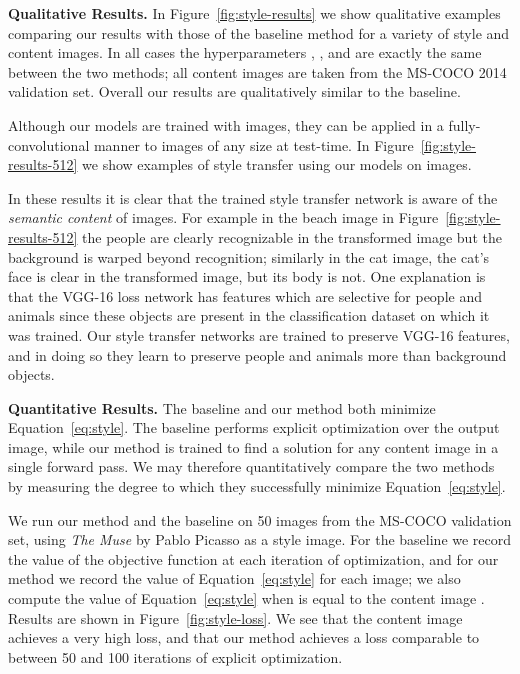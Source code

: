 \documentclass[runningheads]{llncs}
\begin{document}
\vspace{1mm}
\noindent \textbf{Qualitative Results.}
In Figure~\ref{fig:style-results} we show qualitative examples comparing our results with those
of the baseline method for a variety of style and content images. In all cases the hyperparameters
, , and  are exactly the same between the two methods; all
content images are taken from the MS-COCO 2014 validation set. Overall our results
are qualitatively similar to the baseline.

Although our models are trained with  images, they can be applied in a fully-convolutional
manner to images of any size at test-time. In Figure~\ref{fig:style-results-512} we show examples
of style transfer using our models on  images.

In these results it is clear that the trained style transfer network is aware of the
\emph{semantic content} of images. For example in
the beach image in Figure~\ref{fig:style-results-512} the people are clearly recognizable in the
transformed image but the background is warped beyond recognition; similarly in the cat image,
the cat's face is clear in the transformed image, but its body is not. One
explanation is that the VGG-16 loss network has features which are selective for people and animals
since these objects are present in the classification dataset on which it was trained. Our style
transfer networks are trained to preserve VGG-16 features, and in doing so they learn to preserve
people and animals more than background objects.

\vspace{1mm}
\noindent \textbf{Quantitative Results.}
The baseline and our method both minimize Equation~\ref{eq:style}. The baseline performs explicit
optimization over the output image, while our method is trained to find a solution for any
content image  in a single forward pass. We may therefore quantitatively compare the two
methods by measuring the degree to which they successfully minimize Equation~\ref{eq:style}.

We run our method and the baseline on 50 images from the MS-COCO validation set, using
\emph{The Muse} by Pablo Picasso as a style image. For the baseline we record the value of the
objective function at each iteration of optimization, and for our method we record the value
of Equation~\ref{eq:style} for each image; we also compute the value of Equation~\ref{eq:style}
when  is equal to the content image . Results are shown in Figure~\ref{fig:style-loss}.
We see that the content image  achieves a very high loss, and that our method achieves a
loss comparable to between 50 and 100 iterations of explicit optimization.
\end{document}
